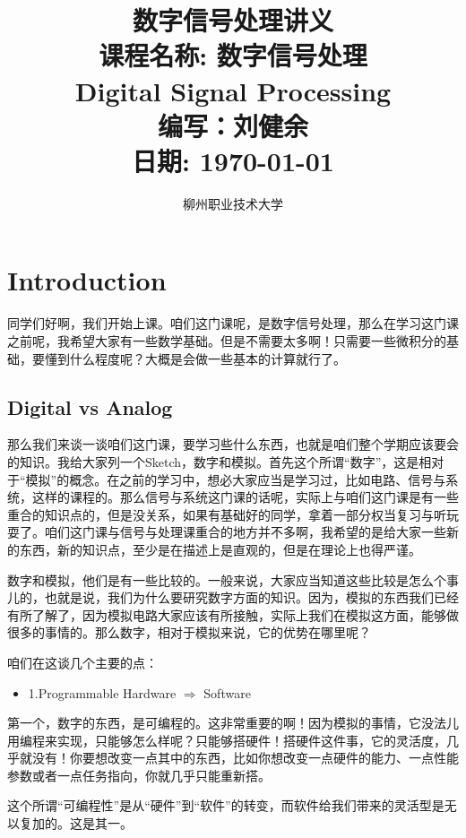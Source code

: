 \documentclass[a4paper,12pt]{article}
\title{
    \vspace{-3cm}
    \Huge{\textbf{数字信号处理讲义}} \\
    \vspace{0.5cm}
    \Large{课程名称: 数字信号处理} \\
    \vspace{1.5cm}
    \Large{Digital Signal Processing} \\
    \vspace{2cm}
    \large{编写：刘健余} \\
    \vfill
    \Large{日期: \today}
}
\author{柳州职业技术大学} %
\date{}
\begin{document}
\maketitle
\newpage

\tableofcontents
\newpage

\section{Introduction}\quad

同学们好啊，我们开始上课。咱们这门课呢，是数字信号处理，那么在学习这门课之前呢，我希望大家有一些数学基础。但是不需要太多啊！只需要一些微积分的基础，要懂到什么程度呢？大概是会做一些基本的计算就行了。

\subsection{Digital vs Analog}\quad

那么我们来谈一谈咱们这门课，要学习些什么东西，也就是咱们整个学期应该要会的知识。我给大家列一个Sketch，数字和模拟。首先这个所谓“数字”，这是相对于“模拟”的概念。在之前的学习中，想必大家应当是学习过，比如电路、信号与系统，这样的课程的。那么信号与系统这门课的话呢，实际上与咱们这门课是有一些重合的知识点的，但是没关系，如果有基础好的同学，拿着一部分权当复习与听玩耍了。咱们这门课与信号与处理课重合的地方并不多啊，我希望的是给大家一些新的东西，新的知识点，至少是在描述上是直观的，但是在理论上也得严谨。



数字和模拟，他们是有一些比较的。一般来说，大家应当知道这些比较是怎么个事儿的，也就是说，我们为什么要研究数字方面的知识。因为，模拟的东西我们已经有所了解了，因为模拟电路大家应该有所接触，实际上我们在模拟这方面，能够做很多的事情的。那么数字，相对于模拟来说，它的优势在哪里呢？


咱们在这谈几个主要的点：


\begin{itemize}
    \item 1.\quad Programmable \quad Hardware $\Longrightarrow$   Software
\end{itemize}


第一个，数字的东西，是可编程的。这非常重要的啊！因为模拟的事情，它没法儿用编程来实现，只能够怎么样呢？只能够搭硬件！搭硬件这件事，它的灵活度，几乎就没有！你要想改变一点其中的东西，比如你想改变一点硬件的能力、一点性能参数或者一点任务指向，你就几乎只能重新搭。

这个所谓“可编程性”是从“硬件”到“软件”的转变，而软件给我们带来的灵活型是无以复加的。这是其一。
\end{document}
